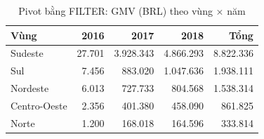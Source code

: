 \begin{table}[htbp]
\centering\small
\caption{Pivot bằng FILTER: GMV (BRL) theo vùng × năm}
\label{tab:olap-pivot}
\begin{tabular}{lrrrr}
\toprule
\textbf{Vùng} & \textbf{2016} & \textbf{2017} & \textbf{2018} & \textbf{Tổng} \\
\midrule
Sudeste & 27.701 & 3.928.343 & 4.866.293 & 8.822.336 \\
Sul & 7.456 & 883.020 & 1.047.636 & 1.938.111 \\
Nordeste & 6.013 & 727.733 & 804.568 & 1.538.314 \\
Centro-Oeste & 2.356 & 401.380 & 458.090 & 861.825 \\
Norte & 1.200 & 168.018 & 164.596 & 333.814 \\
\bottomrule
\end{tabular}
\end{table}
